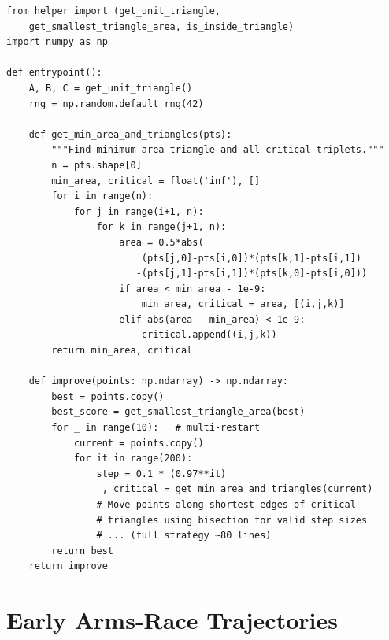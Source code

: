 \documentclass[11pt,a4paper]{article}
\begin{document}
\begin{lstlisting}[caption={Evolved Improver: multi-restart critical-triangle targeting with bisection.}]
from helper import (get_unit_triangle,
    get_smallest_triangle_area, is_inside_triangle)
import numpy as np

def entrypoint():
    A, B, C = get_unit_triangle()
    rng = np.random.default_rng(42)

    def get_min_area_and_triangles(pts):
        """Find minimum-area triangle and all critical triplets."""
        n = pts.shape[0]
        min_area, critical = float('inf'), []
        for i in range(n):
            for j in range(i+1, n):
                for k in range(j+1, n):
                    area = 0.5*abs(
                        (pts[j,0]-pts[i,0])*(pts[k,1]-pts[i,1])
                       -(pts[j,1]-pts[i,1])*(pts[k,0]-pts[i,0]))
                    if area < min_area - 1e-9:
                        min_area, critical = area, [(i,j,k)]
                    elif abs(area - min_area) < 1e-9:
                        critical.append((i,j,k))
        return min_area, critical

    def improve(points: np.ndarray) -> np.ndarray:
        best = points.copy()
        best_score = get_smallest_triangle_area(best)
        for _ in range(10):   # multi-restart
            current = points.copy()
            for it in range(200):
                step = 0.1 * (0.97**it)
                _, critical = get_min_area_and_triangles(current)
                # Move points along shortest edges of critical
                # triangles using bisection for valid step sizes
                # ... (full strategy ~80 lines)
        return best
    return improve
\end{lstlisting}

\section{Early Arms-Race Trajectories}
\end{document}
